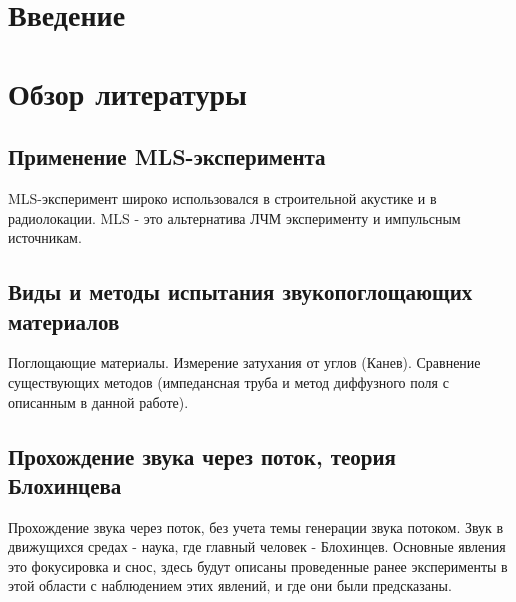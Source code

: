 \chapter*{Введение}                         %

\newcommand{\actuality}{}
\newcommand{\progress}{}
\newcommand{\aim}{{\textbf\aimTXT}}
\newcommand{\tasks}{\textbf{\tasksTXT}}
\newcommand{\novelty}{\textbf{\noveltyTXT}}
\newcommand{\influence}{\textbf{\influenceTXT}}
\newcommand{\methods}{\textbf{\methodsTXT}}
\newcommand{\defpositions}{\textbf{\defpositionsTXT}}
\newcommand{\reliability}{\textbf{\reliabilityTXT}}
\newcommand{\probation}{\textbf{\probationTXT}}
\newcommand{\contribution}{\textbf{\contributionTXT}}
\newcommand{\publications}{\textbf{\publicationsTXT}}


\chapter{Обзор литературы}

\section{Применение MLS-эксперимента}

MLS-эксперимент широко использовался в строительной акустике и в радиолокации. MLS - это альтернатива ЛЧМ эксперименту и импульсным источникам.

\section{Виды и методы испытания звукопоглощающих материалов}

Поглощающие материалы. Измерение затухания от углов (Канев). Сравнение существующих методов (импедансная труба и метод диффузного поля с описанным в данной работе). 

\section{Прохождение звука через поток, теория Блохинцева}

Прохождение звука через поток, без учета темы генерации звука потоком. Звук в движущихся средах - наука, где главный человек - Блохинцев. Основные явления это фокусировка и снос, здесь будут описаны проведенные ранее эксперименты в этой области с наблюдением этих явлений, и где они были предсказаны. 

